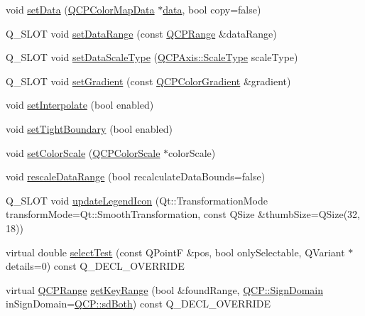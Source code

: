 \begin{DoxyCompactItemize}
\item 
void \hyperlink{class_q_c_p_color_map_a5a23e133a20c4ccad35fd32e6c0f9809}{set\+Data} (\hyperlink{class_q_c_p_color_map_data}{Q\+C\+P\+Color\+Map\+Data} $\ast$\hyperlink{class_q_c_p_color_map_a3ae12c9ce842352037cd20ea5267414f}{data}, bool copy=false)
\item 
Q\+\_\+\+S\+L\+OT void \hyperlink{class_q_c_p_color_map_a980b42837821159786a85b4b7dcb8774}{set\+Data\+Range} (const \hyperlink{class_q_c_p_range}{Q\+C\+P\+Range} \&data\+Range)
\item 
Q\+\_\+\+S\+L\+OT void \hyperlink{class_q_c_p_color_map_a9d20aa08e3c1f20f22908c45b9c06511}{set\+Data\+Scale\+Type} (\hyperlink{class_q_c_p_axis_a36d8e8658dbaa179bf2aeb973db2d6f0}{Q\+C\+P\+Axis\+::\+Scale\+Type} scale\+Type)
\item 
Q\+\_\+\+S\+L\+OT void \hyperlink{class_q_c_p_color_map_a7313c78360471cead3576341a2c50377}{set\+Gradient} (const \hyperlink{class_q_c_p_color_gradient}{Q\+C\+P\+Color\+Gradient} \&gradient)
\item 
void \hyperlink{class_q_c_p_color_map_a484eaa8a5065cfc386b15375bf98b964}{set\+Interpolate} (bool enabled)
\item 
void \hyperlink{class_q_c_p_color_map_ad03221cc285e5f562a0b13d684b5576d}{set\+Tight\+Boundary} (bool enabled)
\item 
void \hyperlink{class_q_c_p_color_map_aa828921db364fe3c6af4619580ab85fd}{set\+Color\+Scale} (\hyperlink{class_q_c_p_color_scale}{Q\+C\+P\+Color\+Scale} $\ast$color\+Scale)
\item 
void \hyperlink{class_q_c_p_color_map_a856608fa3dd1cc290bcd5f29a5575774}{rescale\+Data\+Range} (bool recalculate\+Data\+Bounds=false)
\item 
Q\+\_\+\+S\+L\+OT void \hyperlink{class_q_c_p_color_map_a5d8158b62d55fcfeaabcb68ce0083e87}{update\+Legend\+Icon} (Qt\+::\+Transformation\+Mode transform\+Mode=Qt\+::\+Smooth\+Transformation, const Q\+Size \&thumb\+Size=Q\+Size(32, 18))
\item 
virtual double \hyperlink{class_q_c_p_color_map_afb4b843596addf58096082827a9e3450}{select\+Test} (const Q\+PointF \&pos, bool only\+Selectable, Q\+Variant $\ast$details=0) const Q\+\_\+\+D\+E\+C\+L\+\_\+\+O\+V\+E\+R\+R\+I\+DE
\item 
virtual \hyperlink{class_q_c_p_range}{Q\+C\+P\+Range} \hyperlink{class_q_c_p_color_map_a985861974560f950af6cb7fae8c46267}{get\+Key\+Range} (bool \&found\+Range, \hyperlink{namespace_q_c_p_afd50e7cf431af385614987d8553ff8a9}{Q\+C\+P\+::\+Sign\+Domain} in\+Sign\+Domain=\hyperlink{namespace_q_c_p_afd50e7cf431af385614987d8553ff8a9a3dee7e9cd2fedce9253b83e172626a6c}{Q\+C\+P\+::sd\+Both}) const Q\+\_\+\+D\+E\+C\+L\+\_\+\+O\+V\+E\+R\+R\+I\+DE

\end{DoxyCompactItemize}
